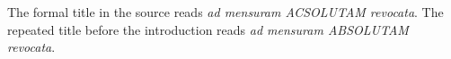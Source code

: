 The formal title in the source reads \textit{ad mensuram ACSOLUTAM revocata}. The repeated title before the introduction reads \textit{ad mensuram ABSOLUTAM revocata}.
